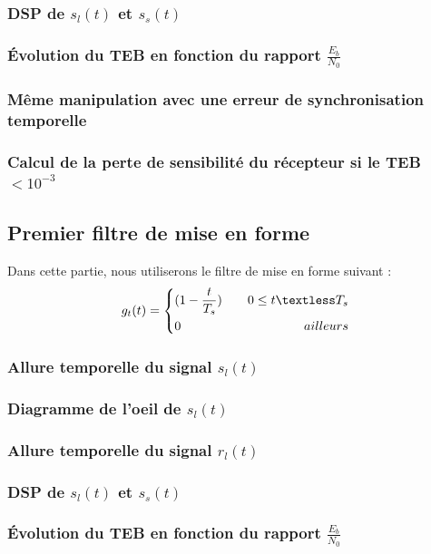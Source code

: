\documentclass[11pt]{article}
\begin{document}
		
		\subsubsection{DSP de $s_l(t)$ et $s_s(t)$}
		\subsubsection{Évolution du TEB en fonction du rapport $\frac{E_b}{N_0}$}
		\subsubsection{Même manipulation avec une erreur de synchronisation temporelle}
		\subsubsection{Calcul de la perte de sensibilité du récepteur si le TEB $< 10^{-3}$}
	
	\subsection{Premier filtre de mise en forme}
		Dans cette partie, nous utiliserons le filtre de mise en forme suivant :
		\begin{equation}
			g_t(t) = 
			\left\{
		    	\begin{aligned}
		    		&(1-\frac{t}{T_s}) & \,\,\,\,\,\, 0 \le t \textless T_s\\
		    		&0 & \,\,\,\,\,\, ailleurs
		      	\end{aligned}
		    \right.
		\end{equation}
		
		\subsubsection{Allure temporelle du signal $s_l(t)$}
		\subsubsection{Diagramme de l'oeil de $s_l(t)$}
		\subsubsection{Allure temporelle du signal $r_l(t)$}
		\subsubsection{DSP de $s_l(t)$ et $s_s(t)$}
		\subsubsection{Évolution du TEB en fonction du rapport $\frac{E_b}{N_0}$}
\end{document}
